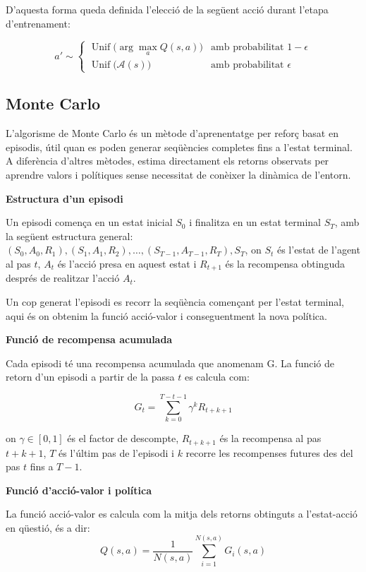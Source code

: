\documentclass[12pt,a4paper]{report}
\begin{document}
D'aquesta forma queda definida l'elecció de la següent acció durant l'etapa d'entrenament:

\[
  a' \sim 
  \begin{cases}
  \operatorname{Unif}\!\bigl(\arg\max_{a} Q(s,a)\bigr)      & \text{amb probabilitat } 1-\epsilon \\[4pt]
  \operatorname{Unif}\!\bigl(\mathcal{A}(s)\bigr)           & \text{amb probabilitat } \epsilon
  \end{cases}
\]

\newpage
\subsection{Monte Carlo}

L'algorisme de Monte Carlo és un mètode d'aprenentatge per reforç basat en episodis, útil quan es poden generar seqüències completes fins a l'estat terminal.
A diferència d'altres mètodes, estima directament els retorns observats per aprendre valors i polítiques sense necessitat de conèixer la dinàmica de l'entorn.

\textbf{Estructura d'un episodi}

Un episodi comença en un estat inicial $S_0$ i finalitza en un estat terminal $S_T$, amb la següent estructura general:
$(S_0, A_0, R_1), (S_1, A_1, R_2), \dots, (S_{T-1}, A_{T-1}, R_T), S_T$, on $S_t$ és l'estat de l'agent al pas $t$, $A_t$ 
és l'acció presa en aquest estat i $R_{t+1}$ és la recompensa obtinguda després de realitzar l'acció $A_t$.

Un cop generat l'episodi es recorr la seqüència començant per l'estat terminal, aqui és on obtenim la
funció acció-valor i conseguentment la nova política.

\textbf{Funció de recompensa acumulada}

Cada episodi té una recompensa acumulada que anomenam G. La funció de retorn d'un episodi a partir de la passa $t$ es calcula com:

\begin{equation*}
G_t = \sum_{k=0}^{T - t - 1} \gamma^{k} R_{t+k+1}
\end{equation*}

on $\gamma \in [0,1]$ és el factor de descompte, $R_{t+k+1}$ és la recompensa al pas $t+k+1$,
$T$ és l’últim pas de l’episodi i $k$ recorre les recompenses futures des del pas $t$ fins a $T-1$.

\textbf{Funció d'acció-valor i política}

La funció acció-valor es calcula com la mitja dels retorns obtinguts a l'estat-acció en qüestió, és a dir:
\vspace*{0.5cm}
\begin{equation*}
Q(s,a) = \frac{1}{N(s,a)} \sum_{i=1}^{N(s,a)} G_i(s,a)
\end{equation*}
\end{document}
